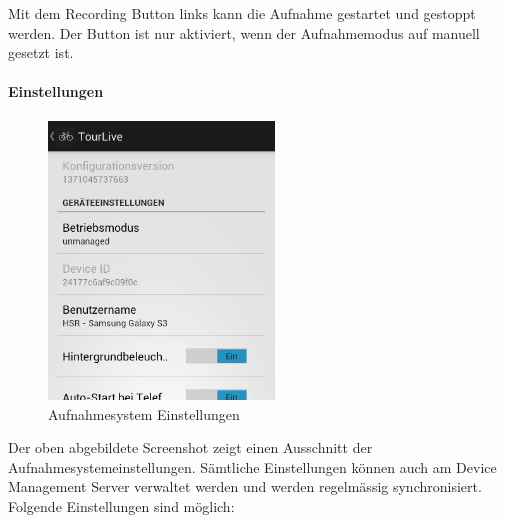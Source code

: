 Mit dem Recording Button links kann die Aufnahme gestartet und gestoppt werden. Der Button ist nur aktiviert, wenn der Aufnahmemodus auf manuell gesetzt ist.

\paragraph{Einstellungen}
\begin{figure}[H]
	\centering
	\includegraphics[width=60mm]{images/android/settings.png}
	\caption{Aufnahmesystem Einstellungen}
\end{figure}

Der oben abgebildete Screenshot zeigt einen Ausschnitt der Aufnahmesystemeinstellungen. Sämtliche Einstellungen können auch am Device Management Server verwaltet werden und werden regelmässig synchronisiert. Folgende Einstellungen sind möglich:

